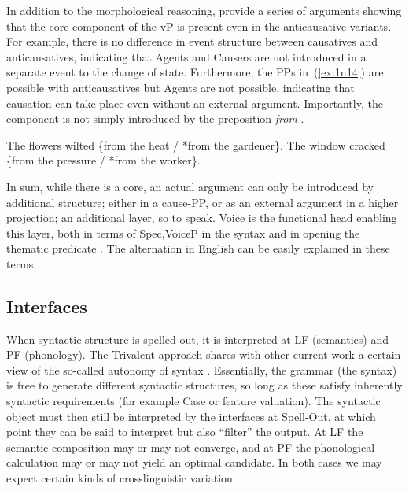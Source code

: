 \begin{exe}
\begin{xlist}
\begin{exe}
\begin{exe}
\begin{exe}
\begin{exe}
\begin{xlist}
\begin{exe}
\begin{xlist}
\begin{xlist}
\begin{xlist}
\begin{exe}
\begin{xlist}
\begin{exe}
\begin{exe}
\begin{xlist}
\begin{exe}
\begin{xlist}
\begin{exe}
In addition to the morphological reasoning, \cite{layering15} provide a series of arguments showing that the core  component of the vP is present even in the anticausative variants. For example, there is no difference in event structure between causatives and anticausatives, indicating that Agents and Causers are not introduced in a separate event to the change of state. Furthermore, the  PPs in~(\ref{ex:1n14}) are possible with anticausatives but Agents are not possible, indicating that causation can take place even without an external argument. Importantly, the  component is not simply introduced by the preposition \emph{from} \citep[30]{alexiadouetal06,alexiadouetal06nels,layering15}.
 \begin{exe}
 \ex  \label{ex:1n14}
 \begin{xlist} 
 	\ex  The flowers wilted \{from the heat / *from the gardener\}. 
 	\ex  The window cracked \{from the pressure / *from the worker\}. 
 \z
\z 

In sum, while there is a  core, an actual  argument can only be introduced by additional structure; either in a cause-PP, or as an external argument in a higher projection; an additional layer, so to speak. Voice is the functional head enabling this layer, both in terms of  Spec,VoiceP in the syntax and in opening the thematic predicate . The  alternation in English can be easily explained in these terms.

	\subsection{Interfaces} \label{intro:arch:inter}
When syntactic structure is spelled-out, it is interpreted at LF (semantics) and PF (phonology). The Trivalent approach shares with other current work a certain view of the so-called autonomy of syntax \citep{marantz13,wood15springer,woodmarantz17,myler17oup}. Essentially, the grammar (the syntax) is free to generate different syntactic structures, so long as these satisfy inherently syntactic requirements (for example Case  or feature valuation). The syntactic object must then still be interpreted by the interfaces at Spell-Out, at which point they can be said to interpret but also ``filter'' the output. At LF the semantic composition may or may not converge, and at PF the phonological calculation may or may not yield an optimal candidate. In both cases we may expect certain kinds of crosslinguistic variation.


\end{xlist}
\end{exe}
\end{exe}
\end{xlist}
\end{exe}
\end{xlist}
\end{exe}
\end{exe}
\end{xlist}
\end{exe}
\end{xlist}
\end{xlist}
\end{xlist}
\end{exe}
\end{xlist}
\end{exe}
\end{exe}
\end{exe}
\end{exe}
\end{xlist}
\end{exe}
